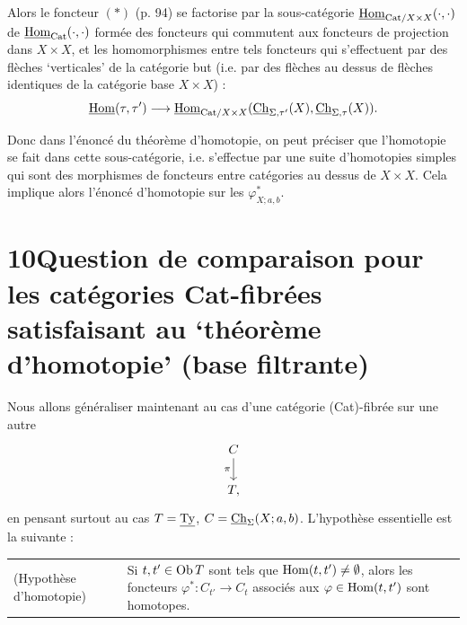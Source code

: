 Alors le foncteur $(*)$ (p. 94) se factorise par la sous-catégorie $\underline{\mathrm{Hom}}_{\mathrm{Cat}/X\times X}(\cdot,\cdot)$ de $\underline{\mathrm{Hom}}_{\mathrm{Cat}}(\cdot,\cdot)$ formée des foncteurs qui commutent aux foncteurs de projection dans $X\times X$, et les homomorphismes entre tels foncteurs qui s'effectuent par des flèches `verticales' de la catégorie but (i.e. par des flèches au dessus de flèches identiques de la catégorie base $X\times X$) :
\[
\underline{\mathrm{Hom}}(\tau,\tau')\longrightarrow\underline{\mathrm{Hom}}_{\mathrm{Cat}/X\times X}(\underline{\mathrm{Ch}}_{\Sigma,\tau'}(X),\underline{\mathrm{Ch}}_{\Sigma,\tau}(X)).
\]

Donc dans l'énoncé du théorème d'homotopie, on peut préciser que l'homotopie se fait dans cette sous-catégorie, i.e. s'effectue par une suite d'homotopies simples qui sont des morphismes de foncteurs entre catégories au dessus de $X\times X$. Cela implique alors l'énoncé d'homotopie sur les $\varphi^*_{X;a,b}$.

\leavevmode{}

\section*{10\quad Question de comparaison pour les catégories \textmd{Cat}-fibrées satisfaisant au ‘théorème d'homotopie' (base filtrante)}

Nous allons généraliser maintenant au cas d'une catégorie (Cat)-fibrée sur une autre
\[
\begin{tikzcd}
C \arrow[d, "\pi"'] \\
T,
\end{tikzcd}
\]
en pensant surtout au cas $T = \underline{\mathrm{Ty}}$, $C = \underline{\mathrm{Ch}}_{\Sigma}(X;a,b)$. L'hypothèse essentielle est la suivante :

\noindent\begin{tabular}{@{}p{}p{}@{}}
(Hypothèse d'homotopie) & Si $t,t' \in \mathrm{Ob}\, T$ sont tels que $\mathrm{Hom}(t,t') \neq \emptyset$, alors les foncteurs $\varphi^{*} : C_{t'} \longrightarrow C_{t}$ associés aux $\varphi \in \mathrm{Hom}(t,t')$ sont homotopes.
\end{tabular}

